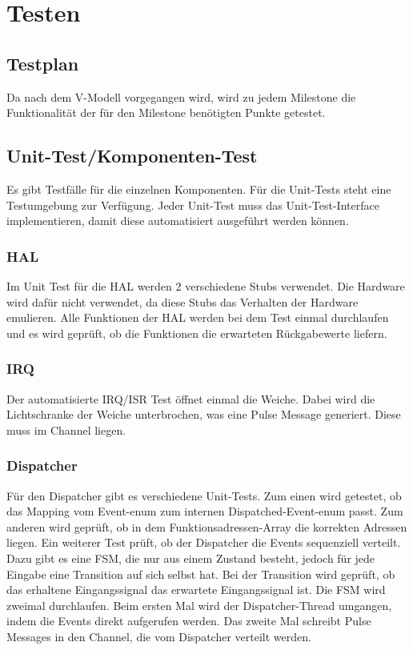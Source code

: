 \documentclass[oneside,a4paper,titlepage]{scrartcl}              %
\begin{document}
\section{Testen}

\subsection{Testplan}
Da nach dem V-Modell vorgegangen wird, wird zu jedem Milestone die Funktionalität der für den Milestone benötigten Punkte getestet.

\subsection{Unit-Test/Komponenten-Test}
Es gibt Testfälle für die einzelnen Komponenten. Für die Unit-Tests steht eine Testumgebung zur Verfügung.
Jeder Unit-Test muss das Unit-Test-Interface implementieren, damit diese automatisiert ausgeführt werden
können.

\subsubsection{HAL}
Im Unit Test für die HAL werden 2 verschiedene Stubs verwendet. Die Hardware wird dafür nicht verwendet,
da diese Stubs das Verhalten der Hardware emulieren. Alle Funktionen der HAL werden bei dem Test einmal durchlaufen
und es wird geprüft, ob die Funktionen die erwarteten Rückgabewerte liefern.

\subsubsection{IRQ}
Der automatisierte IRQ/ISR Test öffnet einmal die Weiche. Dabei wird die Lichtschranke der Weiche unterbrochen,
was eine Pulse Message generiert. Diese muss im Channel liegen.

\subsubsection{Dispatcher}
Für den Dispatcher gibt es verschiedene Unit-Tests. Zum einen wird getestet,
ob das Mapping vom Event-enum zum internen Dispatched-Event-enum passt.
Zum anderen wird geprüft, ob in dem Funktionsadressen-Array die korrekten Adressen liegen.\newline
Ein weiterer Test prüft, ob der Dispatcher die Events sequenziell verteilt. Dazu gibt es eine
FSM, die nur aus einem Zustand besteht, jedoch für jede Eingabe eine Transition auf sich selbst hat.\newline
Bei der Transition wird geprüft, ob das erhaltene Eingangssignal das erwartete Eingangssignal ist.
Die FSM wird zweimal durchlaufen. Beim ersten Mal wird der Dispatcher-Thread umgangen, indem die Events
direkt aufgerufen werden. Das zweite Mal schreibt Pulse Messages in den Channel, die vom Dispatcher
verteilt werden.
\end{document}
